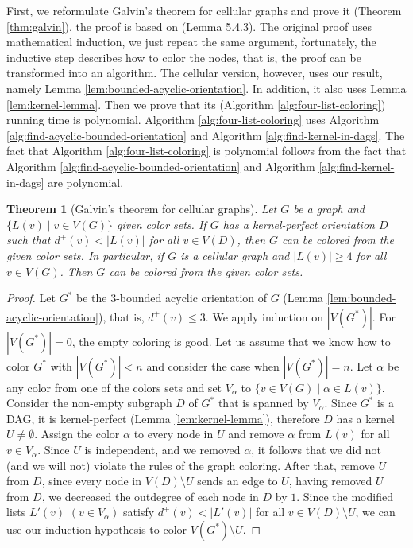\documentclass[a4paper, 12pt]{article}
\newtheorem{theo}[lem]{Theorem}
\begin{document}
First, we reformulate Galvin's theorem for cellular graphs and prove it (Theorem \ref{thm:galvin}), the proof is based on \cite{citeulike:395714} (Lemma 5.4.3). The original proof uses mathematical induction, we just repeat the same argument, fortunately, the inductive step describes how to color the nodes, that is, the proof can be transformed into an algorithm. The cellular version, however, uses our result, namely Lemma \ref{lem:bounded-acyclic-orientation}. In addition, it also uses Lemma \ref{lem:kernel-lemma}. Then we prove that its (Algorithm \ref{alg:four-list-coloring}) running time is polynomial. Algorithm \ref{alg:four-list-coloring} uses Algorithm \ref{alg:find-acyclic-bounded-orientation} and Algorithm \ref{alg:find-kernel-in-dags}. The fact that Algorithm \ref{alg:four-list-coloring} is polynomial follows from the fact that Algorithm \ref{alg:find-acyclic-bounded-orientation} and Algorithm \ref{alg:find-kernel-in-dags} are polynomial.
\begin{theo}[Galvin's theorem for cellular graphs] Let $G$ be a graph and $\lbrace L(v) \mid v \in V(G) \rbrace$ given color sets. If $G$ has a kernel-perfect orientation $D$ such that $d^+(v) < |L(v)|$ for all $v \in V(D)$, then $G$ can be colored from the given color sets.
In particular, if $G$ is a cellular graph and $|L(v)| \geqslant 4$ for all $v \in V(G)$. Then $G$ can be colored from the given color sets.
\end{theo}
\begin{proof}
Let $G^*$ be the $3$-bounded acyclic orientation of $G$ (Lemma \ref{lem:bounded-acyclic-orientation}), that is, $d^+(v) \leqslant 3$. We apply induction on $|V(G^*)|$. For $|V(G^*)|=0$, the empty coloring is good. Let us assume that we know how to color $G^*$ with $|V(G^*)| < n$ and consider the case when $|V(G^*)|=n$. Let $\alpha$ be any color from one of the colors sets and set $V_\alpha$ to $\lbrace v \in V(G) \mid \alpha \in L(v) \rbrace$. Consider the non-empty subgraph $D$ of $G^*$ that is spanned by $V_\alpha$. Since $G^*$ is a DAG, it is kernel-perfect (Lemma \ref{lem:kernel-lemma}), therefore $D$ has a kernel $U \neq \emptyset$. Assign the color $\alpha$ to every node in $U$ and remove $\alpha$ from $L(v)$ for all $v \in V_\alpha$. Since $U$ is independent, and we removed $\alpha$, it follows that we did not (and we will not) violate the rules of the graph coloring. After that, remove $U$ from $D$, since every node in $V(D) \setminus U$ sends an edge to $U$, having removed $U$ from $D$, we decreased the outdegree of each node in $D$ by $1$. Since the modified lists $L'(v)$ $(v \in V_\alpha)$ satisfy $d^+(v) < |L'(v)|$ for all $v \in V(D) \setminus U$, we can use our induction hypothesis to color $V(G^*) \setminus U$.
\end{proof}
\end{document}
